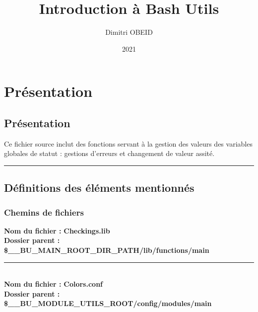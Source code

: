 \documentclass[a4paper,10pt]{article}
\title{\color{red}Introduction à Bash Utils}\color{white}
\author{Dimitri OBEID}
\date{2021}
\begin{document}
\maketitle
\newpage

\hypertarget{contents}{}
\tableofcontents
\newpage

\color{red}
\section{Présentation}\color{white}

\color{green}
\subsection{Présentation}\color{white}
Ce fichier source inclut des fonctions servant à la gestion des valeurs des variables globales de statut : gestions d'erreurs et changement de valeur assité.\\[1\baselineskip]



\color{green}\par\noindent\rule{\textwidth}{0.4pt}\color{white}

\color{green}
\subsection{Définitions des éléments mentionnés}\color{white}

\color{blue}
\subsubsection{Chemins de fichiers}\color{white}
\textbf{Nom du fichier :} \textbf{\color{lime}Checkings.lib\color{white}}\\[1\baselineskip]
\textbf{Dossier parent :} \textbf{\color{orange}\$\_\_BU\_MAIN\_ROOT\_DIR\_PATH\color{lime}/lib/functions/main\color{white}}\\[1\baselineskip]



\color{lime}\par\noindent\rule{\textwidth}{0.4pt}\color{white}\\[1\baselineskip]

\textbf{Nom du fichier :} \textbf{\color{lime}Colors.conf\color{white}}\\[1\baselineskip]
\textbf{Dossier parent :} \textbf{\color{orange}\$\_\_BU\_MODULE\_UTILS\_ROOT\color{lime}/config/modules/main\color{white}}\\[1\baselineskip]
\end{document}

